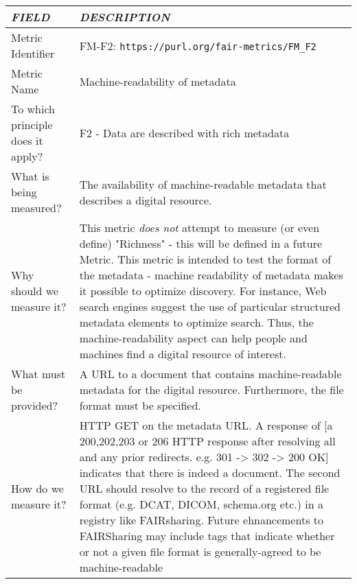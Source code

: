 \documentclass[english]{article}
\begin{document}
\newpage


\centering





\begin{tabular}{|p{5cm}|p{9cm}|}
\hline
\emph{FIELD} & \emph{DESCRIPTION} \\
\hline
Metric Identifier &   FM-F2: \verb"https://purl.org/fair-metrics/FM_F2"
 \\


\hline
Metric Name &   
Machine-readability of metadata

 \\



\hline
To which principle does it apply? &   F2 - Data are described with rich metadata\\



\hline
What is being measured? & 

The availability of machine-readable metadata that describes a digital resource.\\



\hline
Why should we measure it? & 


This metric \textit{does not} attempt to measure (or even define) "Richness" - this will be defined in a future Metric.  This metric is intended to test the format of the metadata - machine readability of metadata makes it possible to optimize discovery. For instance, Web search engines suggest the use of particular structured metadata elements to optimize search. Thus, the machine-readability aspect can help people and machines find a digital resource of interest. 

  
\\



\hline
What must be provided? &  

A URL to a document that contains machine-readable metadata for the digital resource. Furthermore, the file format must be specified.

 \\



\hline
How do we measure it? &  
HTTP GET on the metadata URL. A response of [a 200,202,203 or 206 HTTP response after resolving all and any prior redirects. e.g. 301 -> 302 -> 200 OK] indicates that there is indeed a document. The second URL should resolve to the record of a registered file format (e.g. DCAT, DICOM, schema.org etc.) in a registry like FAIRsharing.  Future ehnancements to FAIRSharing may include tags that indicate whether or not a given file format is generally-agreed to be machine-readable \newline
\\




\end{tabular}
\end{document}
